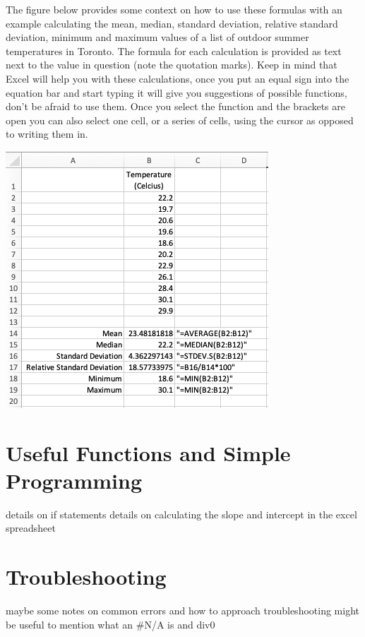 \documentclass[
]{book}
\begin{document}
The figure below provides some context on how to use these formulas with an example calculating the mean, median, standard deviation, relative standard deviation, minimum and maximum values of a list of outdoor summer temperatures in Toronto. The formula for each calculation is provided as text next to the value in question (note the quotation marks). Keep in mind that Excel will help you with these calculations, once you put an equal sign into the equation bar and start typing it will give you suggestions of possible functions, don't be afraid to use them. Once you select the function and the brackets are open you can also select one cell, or a series of cells, using the cursor as opposed to writing them in.

\includegraphics{images/SimpleStats.png}

\hypertarget{useful-functions-and-simple-programming}{%
\section{Useful Functions and Simple Programming}\label{useful-functions-and-simple-programming}}

details on if statements
details on calculating the slope and intercept in the excel spreadsheet

\hypertarget{troubleshooting}{%
\section{Troubleshooting}\label{troubleshooting}}

maybe some notes on common errors and how to approach troubleshooting
might be useful to mention what an \#N/A is and div0
\end{document}
